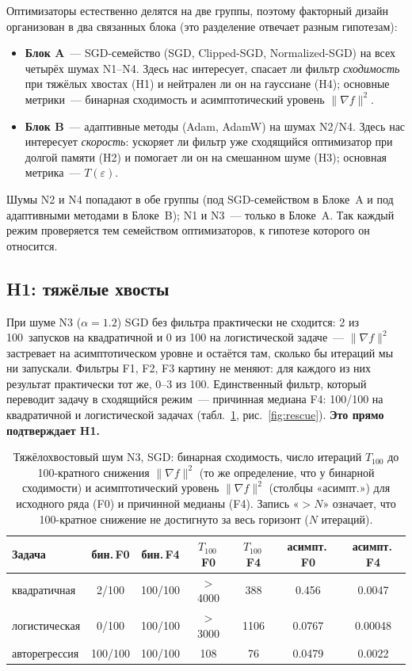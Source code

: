 \documentclass[conference]{IEEEtran}
\begin{document}
Оптимизаторы естественно делятся на две группы, поэтому факторный
дизайн организован в два связанных блока (это разделение отвечает разным
гипотезам):
\begin{itemize}
  \item \textbf{Блок A}~--- SGD-семейство (SGD, Clipped-SGD,
        Normalized-SGD) на всех четырёх шумах N1--N4. Здесь нас интересует, спасает
        ли фильтр \emph{сходимость} при тяжёлых хвостах (H1) и нейтрален
        ли он на гауссиане (H4); основные метрики~--- бинарная сходимость
        и асимптотический уровень $\|\nabla f\|^2$.
  \item \textbf{Блок B}~--- адаптивные методы (Adam, AdamW) на шумах
        N2/N4. Здесь нас интересует \emph{скорость}: ускоряет ли фильтр
        уже сходящийся оптимизатор при долгой памяти (H2) и помогает ли
        он на смешанном шуме (H3); основная метрика~--- $T(\varepsilon)$.
\end{itemize}
Шумы N2 и N4 попадают в обе группы (под SGD-семейством в Блоке~A и под
адаптивными методами в Блоке~B); N1 и N3~--- только в Блоке~A. Так каждый
режим проверяется тем семейством оптимизаторов, к гипотезе которого он
относится.

\subsection{H1: тяжёлые хвосты}

При шуме N3 ($\alpha=1.2$) SGD без фильтра практически не сходится: 2 из
100~запусков на квадратичной и 0 из 100 на логистической задаче~--- $\|\nabla f\|^2$
застревает на асимптотическом уровне и остаётся там, сколько бы итераций
мы ни запускали. Фильтры F1, F2, F3 картину не меняют: для каждого из них
результат практически тот же, 0--3 из 100. Единственный фильтр, который переводит задачу в
сходящийся режим~--- причинная медиана F4: 100/100 на квадратичной и
логистической задачах (табл.~\ref{tab:rescue}, рис.~\ref{fig:rescue}).
\textbf{Это прямо подтверждает H1.}

\begin{table}[H]
\centering\footnotesize
\setlength{\tabcolsep}{2pt}
\caption{Тяжёлохвостовый шум N3, SGD: бинарная сходимость, число итераций
$T_{100}$ до 100-кратного снижения $\|\nabla f\|^2$ (то же определение, что
у бинарной сходимости) и асимптотический уровень $\|\nabla f\|^2$ (столбцы
«асимпт.») для исходного ряда (F0) и причинной медианы (F4). Запись
«$>N$» означает, что 100-кратное снижение не достигнуто за весь горизонт
($N$ итераций).}
\label{tab:rescue}
\begin{tabular}{lcccccc}
\toprule
Задача & бин.\,F0 & бин.\,F4 & $T_{100}$\,F0 & $T_{100}$\,F4 & асимпт.\,F0 & асимпт.\,F4 \\
\midrule
квадратичная  & 2/100 & 100/100 & $>$4000 & 388  & 0.456  & 0.0047  \\
логистическая & 0/100 & 100/100 & $>$3000 & 1106 & 0.0767 & 0.00048 \\
авторегрессия & 100/100 & 100/100 & 108     & 76   & 0.0479 & 0.0022  \\
\bottomrule
\end{tabular}
\end{table}
\end{document}
